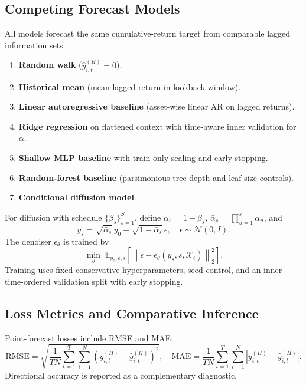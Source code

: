 \subsection{Competing Forecast Models}
All models forecast the same cumulative-return target from comparable lagged information sets:
\begin{enumerate}
  \item \textbf{Random walk} (\(\hat{y}_{i,t}^{(H)}=0\)).
  \item \textbf{Historical mean} (mean lagged return in lookback window).
  \item \textbf{Linear autoregressive baseline} (asset-wise linear AR on lagged returns).
  \item \textbf{Ridge regression} on flattened context with time-aware inner validation for \(\alpha\).
  \item \textbf{Shallow MLP baseline} with train-only scaling and early stopping.
  \item \textbf{Random-forest baseline} (parsimonious tree depth and leaf-size controls).
  \item \textbf{Conditional diffusion model}.
\end{enumerate}

For diffusion with schedule \(\{\beta_s\}_{s=1}^{S}\), define \(\alpha_s=1-\beta_s\), \(\bar{\alpha}_s=\prod_{u=1}^{s}\alpha_u\), and
\begin{equation}
y_s = \sqrt{\bar{\alpha}_s}\,y_0 + \sqrt{1-\bar{\alpha}_s}\,\epsilon, \quad \epsilon\sim\mathcal{N}(0,I).
\end{equation}
The denoiser \(\epsilon_{\theta}\) is trained by
\begin{equation}
\min_{\theta}\;\mathbb{E}_{y_0,\epsilon,s}\!\left[\left\|\epsilon-\epsilon_{\theta}(y_s,s,\mathcal{X}_t)\right\|_2^2\right].
\label{eq:ddpm-loss}
\end{equation}
Training uses fixed conservative hyperparameters, seed control, and an inner time-ordered validation split with early stopping.

\subsection{Loss Metrics and Comparative Inference}
Point-forecast losses include RMSE and MAE:
\begin{equation}
\text{RMSE}=
\sqrt{
\frac{1}{TN}
\sum_{t=1}^{T}\sum_{i=1}^{N}
\left(y_{i,t}^{(H)}-\hat{y}_{i,t}^{(H)}\right)^2
}, \quad
\text{MAE}=
\frac{1}{TN}\sum_{t=1}^{T}\sum_{i=1}^{N}
\left|y_{i,t}^{(H)}-\hat{y}_{i,t}^{(H)}\right|.
\end{equation}
Directional accuracy is reported as a complementary diagnostic.

